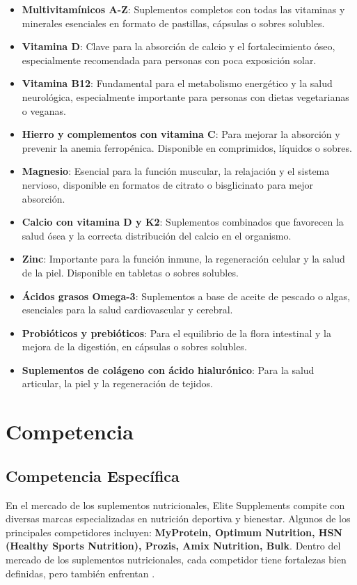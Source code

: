 \documentclass[11pt,a4paper]{report}
\begin{document}
\begin{itemize}
    \item \textbf{Multivitamínicos A-Z}: Suplementos completos con todas las vitaminas y minerales esenciales en formato de pastillas, cápsulas o sobres solubles.  
    \item \textbf{Vitamina D}: Clave para la absorción de calcio y el fortalecimiento óseo, especialmente recomendada para personas con poca exposición solar.  
    \item \textbf{Vitamina B12}: Fundamental para el metabolismo energético y la salud neurológica, especialmente importante para personas con dietas vegetarianas o veganas.  
    \item \textbf{Hierro y complementos con vitamina C}: Para mejorar la absorción y prevenir la anemia ferropénica. Disponible en comprimidos, líquidos o sobres.  
    \item \textbf{Magnesio}: Esencial para la función muscular, la relajación y el sistema nervioso, disponible en formatos de citrato o bisglicinato para mejor absorción.  
    \item \textbf{Calcio con vitamina D y K2}: Suplementos combinados que favorecen la salud ósea y la correcta distribución del calcio en el organismo.  
    \item \textbf{Zinc}: Importante para la función inmune, la regeneración celular y la salud de la piel. Disponible en tabletas o sobres solubles.  
    \item \textbf{Ácidos grasos Omega-3}: Suplementos a base de aceite de pescado o algas, esenciales para la salud cardiovascular y cerebral.  
    \item \textbf{Probióticos y prebióticos}: Para el equilibrio de la flora intestinal y la mejora de la digestión, en cápsulas o sobres solubles.  
    \item \textbf{Suplementos de colágeno con ácido hialurónico}: Para la salud articular, la piel y la regeneración de tejidos.  
\end{itemize}



\section{Competencia}
\subsection{Competencia Específica}

En el mercado de los suplementos nutricionales, Elite Supplements compite con diversas marcas especializadas en nutrición deportiva y bienestar. Algunos de los principales competidores incluyen: \textbf{MyProtein, Optimum Nutrition, HSN (Healthy Sports Nutrition), Prozis, Amix Nutrition, Bulk}. Dentro del mercado de los suplementos nutricionales, cada competidor tiene fortalezas bien definidas, pero también enfrentan \roundhl{\textbf{\textcolor{bknwhite}{debilidades}}}.
\end{document}

